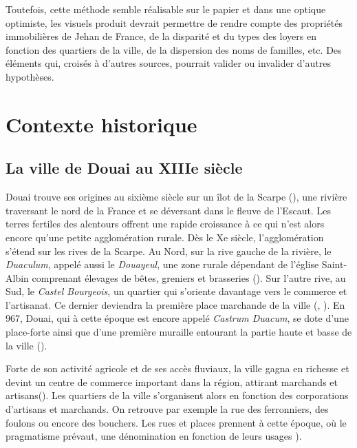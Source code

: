 Toutefois, cette méthode semble réalisable sur le papier et dans une optique optimiste,  les visuels produit devrait permettre de rendre compte des propriétés immobilières de Jehan de France, de la disparité et du types des loyers en fonction des quartiers de la ville, de la dispersion des noms de familles, etc. Des éléments qui, croisés  à d'autres sources, pourrait valider ou invalider d'autres hypothèses. 

\section{Contexte historique}
\subsection{La ville de Douai au XIIIe siècle}

Douai trouve ses origines au sixième siècle sur un îlot de la Scarpe (\cite{mestayer_douai_2016}), une rivière traversant le nord de la France et se déversant dans le fleuve de l'Escaut. Les terres fertiles des alentours offrent une rapide croissance à ce qui n'est alors encore qu'une petite agglomération rurale. Dès le Xe siècle, l'agglomération s'étend sur les rives de la Scarpe. Au Nord, sur la rive gauche de la rivière, le \textit{Duaculum}, appelé aussi le \textit{Douayeul}, une zone rurale dépendant de l'église Saint-Albin comprenant élevages de bêtes, greniers et brasseries (\cite{mestayer_douai_2016}). Sur l'autre rive, au Sud, le \textit{Castel Bourgeois}, un quartier qui s'oriente davantage vers le commerce et l'artisanat. Ce dernier deviendra la première place marchande de la ville (\cite{officedutourisme_douai_2016}, \cite{netteghem_histoire_2021}). En 967, Douai, qui à cette époque est encore appelé \textit{Castrum Duacum}, se dote d'une place-forte ainsi que d'une première muraille entourant la partie haute et basse de la ville (\cite{mestayer_douai_2016}). 

Forte de son activité agricole et de ses accès fluviaux, la ville gagna en richesse et devint un centre de commerce important dans la région, attirant marchands et artisans(\cite{clisant_vie_2003}). Les quartiers de la ville s'organisent alors en fonction des corporations d'artisans et marchands. On retrouve par exemple la rue des ferronniers, des foulons ou encore des bouchers. Les rues et places prennent à cette époque, où le pragmatisme  prévaut, une dénomination en fonction de leurs usages \cite{colin_decouvrez_2001}). 

